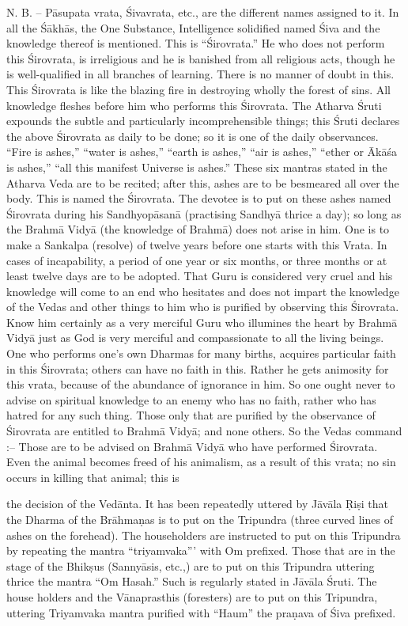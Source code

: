 N. B. -- P\=asupata vrata, \'Sivavrata, etc., are the different names assigned to it. In all the \'S\=akh\=as, the One Substance, Intelligence solidified named \'Siva and the knowledge thereof is mentioned. This is ``\'Sirovrata.'' He who does not perform this \'Sirovrata, is irreligious and he is banished from all religious acts, though he is well-qualified in all branches of learning. There is no manner of doubt in this. This \'Sirovrata is like the blazing fire in destroying wholly the forest of sins. All knowledge fleshes before him who performs this \'Sirovrata. The Atharva \'Sruti expounds the subtle and particularly incomprehensible things; this \'Sruti declares the above \'Sirovrata as daily to be done; so it is one of the daily observances. ``Fire is ashes,'' ``water is ashes,'' ``earth is ashes,'' ``air is ashes,'' ``ether or \=Ak\=a\'sa is ashes,'' ``all this manifest Universe is ashes.'' These six mantras stated in the Atharva Veda are to be recited; after this, ashes are to be besmeared all over the body. This is named the \'Sirovrata. The devotee is to put on these ashes named \'Sirovrata during his Sandhyop\=asan\=a (practising Sandhy\=a thrice a day); so long as the Brahm\=a Vidy\=a (the knowledge of Brahm\=a) does not arise in him. One is to make a Sankalpa (resolve) of twelve years before one starts with this Vrata. In cases of incapability, a period of one year or six months, or three months or at least twelve days are to be adopted. That Guru is considered very cruel and his knowledge will come to an end who hesitates and does not impart the knowledge of the Vedas and other things to him who is purified by observing this \'Sirovrata. Know him certainly as a very merciful Guru who illumines the heart by Brahm\=a Vidy\=a just as God is very merciful and compassionate to all the living beings. One who performs one's own Dharmas for many births, acquires particular faith in this \'Sirovrata; others can have no faith in this. Rather he gets animosity for this vrata, because of the abundance of ignorance in him. So one ought never to advise on spiritual knowledge to an enemy who has no faith, rather who has hatred for any such thing. Those only that are purified by the observance of \'Sirovrata are entitled to Brahm\=a Vidy\=a; and none others. So the Vedas command :-- Those are to be advised on Brahm\=a Vidy\=a who have performed \'Sirovrata. Even the animal becomes freed of his animalism, as a result of this vrata; no sin occurs in killing that animal; this is

the decision of the Ved\=anta. It has been repeatedly uttered by J\=av\=ala \d{R}i\d{s}i that the Dharma of the Br\=ahma\d{n}as is to put on the Tripundra (three curved lines of ashes on the forehead). The householders are instructed to put on this Tripundra by repeating the mantra ``triyamvaka''' with Om prefixed. Those that are in the stage of the Bhik\d{s}us (Sanny\=asis, etc.,) are to put on this Tripundra uttering thrice the mantra ``Om Hasah.'' Such is regularly stated in J\=av\=ala \'Sruti. The house holders and the V\=anaprasthis (foresters) are to put on this Tripundra, uttering Triyamvaka mantra purified with ``Haum'' the pra\d{n}ava of \'Siva prefixed.

